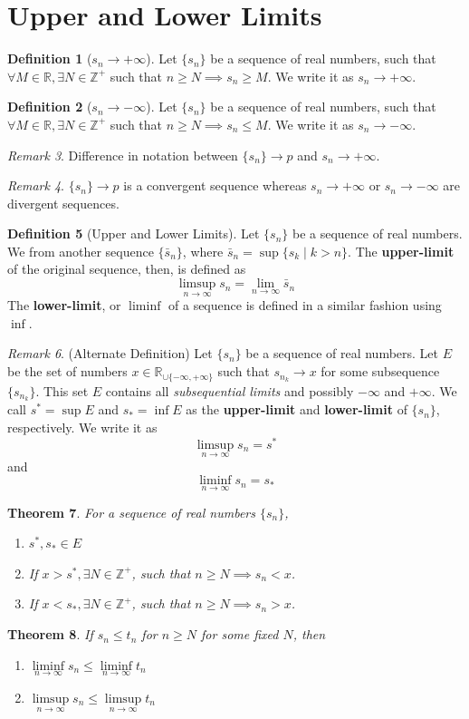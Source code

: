\documentclass[a4paper,12pt]{report}
\newcommand{\Z}{\mathbb{Z}}
\newcommand{\R}{\mathbb{R}}
\newcommand{\tb}{\textbf}
\theoremstyle{plain}
\newtheorem{theorem}{\color{blue}Theorem}[chapter] %
\theoremstyle{definition}
\newtheorem{definition}[theorem]{\color{red}Definition} %
\theoremstyle{remark}
\newtheorem{remark}[theorem]{\color{ForestGreen}Remark} %
\begin{document}
\section{Upper and Lower Limits}
\begin{definition}[$s_n\to +\infty$]
Let $\{s_n\}$ be a sequence of real numbers, such that $\forall M\in\R, \exists N\in\Z^+$ such that $n \ge N\implies s_n \ge M$. We write it as $s_n\to +\infty$.
\end{definition}
\begin{definition}[$s_n\to -\infty$]
Let $\{s_n\}$ be a sequence of real numbers, such that $\forall M\in\R, \exists N\in\Z^+$ such that $n \ge N\implies s_n \le M$. We write it as $s_n\to -\infty$.
\end{definition}
\begin{remark}
Difference in notation between $\{s_n\}\to p$ and $s_n\to +\infty$.
\end{remark}
\begin{remark}
$\{s_n\}\to p$ is a convergent sequence whereas $s_n\to +\infty$ or $s_n\to -\infty$ are divergent sequences.
\end{remark}
\begin{definition}[Upper and Lower Limits]
Let $\{s_n\}$ be a sequence of real numbers. We from another sequence $\{\bar{s}_n\}$, where $\bar{s}_n=\sup \{s_k \mid k > n\}$. The \tb{upper-limit} of the original sequence, then, is defined as
\[
\limsup\limits_{n\to\infty} s_n = \lim\limits_{n\to\infty} \bar{s}_n
\]
The \tb{lower-limit}, or $\liminf$ of a sequence is defined in a similar fashion using $\inf$.
\end{definition}
\begin{remark}(Alternate Definition)
Let $\{s_n\}$ be a sequence of real numbers. Let $E$ be the set of numbers $x\in\R_{\cup\{-\infty,+\infty\}}$ such that $s_{n_k}\to x$ for some subsequence $\{s_{n_k}\}$. This set $E$ contains all \emph{subsequential limits} and possibly $-\infty$ and $+\infty$. We call $s^*=\sup E$ and $s_*=\inf E$ as the \tb{upper-limit} and \tb{lower-limit} of $\{s_n\}$, respectively. We write it as \[\limsup\limits_{n \to \infty} s_n=s^*\] and \[\liminf\limits_{n \to \infty} s_n=s_*\]
\end{remark}
\begin{theorem}
For a sequence of real numbers $\{s_n\}$,
\begin{enumerate}
\item $s^*, s_*\in E$
\item If $x > s^*, \exists N\in\Z^+$, such that $n \ge N\implies s_n < x$.
\item If $x < s_*, \exists N\in\Z^+$, such that $n \ge N\implies s_n > x$.
\end{enumerate}
\end{theorem}
\begin{theorem}
If $s_n \le t_n$ for $n \ge N$ for some fixed $N$, then
\begin{enumerate}
\item $\liminf\limits_{n \to \infty} s_n \le \liminf\limits_{n \to \infty} t_n$
\item $\limsup\limits_{n \to \infty} s_n \le \limsup\limits_{n \to \infty} t_n$
\end{enumerate}
\end{theorem}
\end{document}

